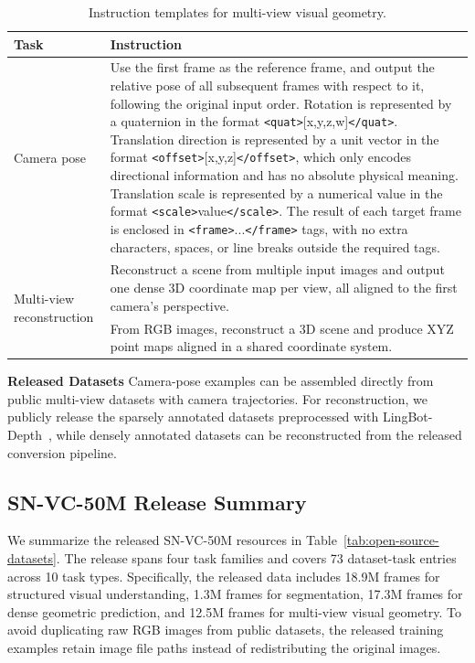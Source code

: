 \begin{table}[htbp]
  \centering
  \footnotesize
  \setlength{\tabcolsep}{3pt}
  \renewcommand{\arraystretch}{0.88}
  \begin{tabular}{p{}|p{}}
    \toprule
    Task & Instruction \\
    \midrule
    Camera pose &
    Use the first frame as the reference frame, and output the relative pose of all subsequent frames with respect to it, following the original input order.
    Rotation is represented by a quaternion in the format \texttt{<quat>}[x,y,z,w]\texttt{</quat>}.
    Translation direction is represented by a unit vector in the format \texttt{<offset>}[x,y,z]\texttt{</offset>}, which only encodes directional information and has no absolute physical meaning.
    Translation scale is represented by a numerical value in the format \texttt{<scale>}value\texttt{</scale>}.
    The result of each target frame is enclosed in \texttt{<frame>}...\texttt{</frame>} tags, with no extra characters, spaces, or line breaks outside the required tags. \\
    \midrule
    \multirow{2}{=}{Multi-view reconstruction}
    & Reconstruct a scene from multiple input images and output one dense 3D coordinate map per view, all aligned to the first camera's perspective. \\
    \cmidrule(lr){2-2}
    & From RGB images, reconstruct a 3D scene and produce XYZ point maps aligned in a shared coordinate system. \\
    \bottomrule
  \end{tabular}
  \caption{Instruction templates for multi-view visual geometry.}
  \label{tab:camera-pose-instruction-format}
\end{table}

\textbf{Released Datasets}
Camera-pose examples can be assembled directly from public multi-view datasets with camera trajectories.
For reconstruction, we publicly release the sparsely annotated datasets preprocessed with LingBot-Depth~\cite{lingbotdepth}, while densely annotated datasets can be reconstructed from the released conversion pipeline.

\subsection{SN-VC-50M Release Summary}
We summarize the released SN-VC-50M resources in Table~\ref{tab:open-source-datasets}.
The release spans four task families and covers 73 dataset-task entries across 10 task types.
Specifically, the released data includes 18.9M frames for structured visual understanding, 1.3M frames for segmentation, 17.3M frames for dense geometric prediction, and 12.5M frames for multi-view visual geometry.
To avoid duplicating raw RGB images from public datasets, the released training examples retain image file paths instead of redistributing the original images.

